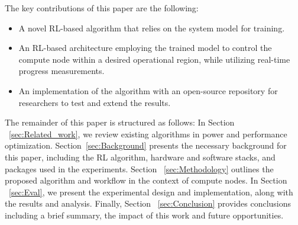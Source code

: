 The key contributions of this paper are the following:
\begin{itemize}
\item A novel RL-based algorithm that relies on the system model for training.
\item An RL-based architecture employing the trained model to control the compute node within a desired operational region, while utilizing real-time progress measurements.
\item An implementation of the algorithm with an open-source repository for researchers to test and extend the results.
\end{itemize}

The remainder of this paper is structured as follows: In Section ~\ref{sec:Related_work}, we review existing algorithms in power and performance optimization. Section~\ref{sec:Background} presents the necessary background for this paper, including the RL algorithm, hardware and software stacks, and packages used in the experiments. Section ~\ref{sec:Methodology} outlines the proposed algorithm and workflow in the context of compute nodes. In Section ~\ref{sec:Eval}, we present the experimental design and implementation, along with the results and analysis. Finally, Section ~\ref{sec:Conclusion} provides conclusions including a brief summary, the impact of this work and future opportunities. 



